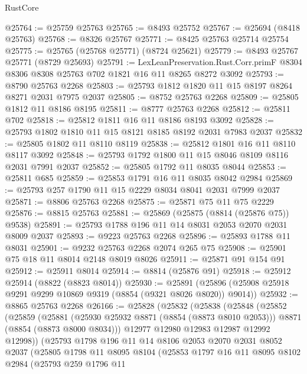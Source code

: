 \begin{lexlean}{RustCore}
\begin{coremodule}
@25764 := @25759 @25763
@25765 := @8493 @25752
@25767 := @25694 (@8418 @25763)
@25768 := @8326 @25767
@25771 := @8425 @25763 @25714 @25754
@25775 := @25765 (@25768 @25771) (@8724 @25621)
@25779 := @8493 @25767 @25771 (@8729 @25693)
@25791 := LexLeanPreservation.Rust.Corr.primF
    @8304
    @8306
    @8308
    @25763
    @702
    @1821
    @16
    @11
    @8265
    @8272
    @3092
@25793 := @8790 @25763 @2268
@25803 := @25793 @1812 @1820 @11 @15 @8197 @8264 @8271 @2031 @7975 @2037
@25805 := @8752 @25763 @2268
@25809 := @25805 @1812 @11 @8186 @8195
@25811 := @8777 @25763 @2268
@25812 := @25811 @702
@25818 := @25812 @1811 @16 @11 @8186 @8193 @3092
@25828 := @25793 @1802 @1810 @11 @15 @8121 @8185 @8192 @2031 @7983 @2037
@25832 := @25805 @1802 @11 @8110 @8119
@25838 := @25812 @1801 @16 @11 @8110 @8117 @3092
@25848 := @25793 @1792 @1800 @11 @15 @8046 @8109 @8116 @2031 @7991 @2037
@25852 := @25805 @1792 @11 @8035 @8044
@25853 := @25811 @685
@25859 := @25853 @1791 @16 @11 @8035 @8042 @2984
@25869 := @25793 @257 @1790 @11 @15 @2229 @8034 @8041 @2031 @7999 @2037
@25871 := @8806 @25763 @2268
@25875 := @25871 @75 @11 @75 @2229
@25876 := @8815 @25763
@25881 := @25869 (@25875 (@8814 (@25876 @75)) @9538)
@25891 := @25793 @1788 @196 @11 @14 @8031 @2053 @2070 @2031 @8009 @2037
@25893 := @9223 @25763 @2268
@25896 := @25893 @1788 @11 @8031
@25901 := @9232 @25763 @2268 @2074 @265 @75
@25908 := @25901 @75 @18 @11 @8014 @2148 @8019 @8026
@25911 := @25871 @91 @154 @91
@25912 := @25911 @8014
@25914 := @8814 (@25876 @91)
@25918 := @25912 @25914 (@8822 (@8823 @8014))
@25930 := @25891 (@25896 (@25908 @25918 @9291 @9299 @10869 @9319 (@8854 (@9321 @8026 @8020)) @9014))
@25932 := @8865 @25763 @2268
@26166 := @25828
    (@25832
      (@25838
        (@25848
          (@25852
            (@25859
              (@25881
                (@25930 @25932 @8871 (@8854 (@8873 @8010 @2053)))
                @8871
                (@8854 (@8873 @8000 @8034)))
              @12977
              @12980
              @12983
              @12987
              @12992
              @12998))
          (@25793
            @1798
            @196
            @11
            @14
            @8106
            @2053
            @2070
            @2031
            @8052
            @2037
            (@25805
              @1798
              @11
              @8095
              @8104
              (@25853
                @1797
                @16
                @11
                @8095
                @8102
                @2984
                (@25793
                  @259
                  @1796
                  @11

\end{coremodule}
\end{lexlean}

